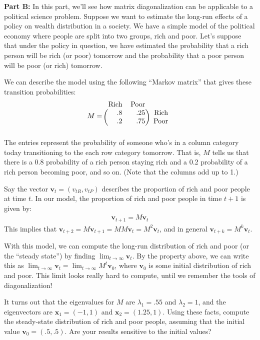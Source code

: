 \documentclass[10pt]{amsart}
\begin{document}
\textbf{Part B:} In this part, we'll see how matrix diagonalization can be applicable to a political science problem. Suppose we want to estimate the long-run effects of a policy on wealth distribution in a society. We have a simple model of the political economy where people are split into two groups, rich and poor. Let's suppose that under the policy in question, we have estimated the probability that a rich person will be rich (or poor) tomorrow and the probability that a poor person will be poor (or rich) tomorrow. 

We can describe the model using the following ``Markov matrix'' that gives these transition probabilities: 
$$
M = \begin{blockarray}{ccc}
\text{Rich} & \text{Poor} \\
\begin{block}{(rr)r}
.8 & .25 & \text{Rich} \\
.2 & .75 & \text{Poor} \\
\end{block}
\end{blockarray}
$$
The entries represent the probability of someone who's in a column category today transitioning to the each row  category tomorrow. That is, $M$ tells us that there is a 0.8 probability of a rich person staying rich and a 0.2 probability of a rich person becoming poor, and so on. (Note that the columns add up to 1.)

Say the vector $\mathbf{v}_t = (v_{tR}, v_{tP})$ describes the proportion of rich and poor people at time $t$. In our model, the proportion of rich and poor people in time $t+1$ is given by:
\begin{align*}
\mathbf{v}_{t+1} = M \mathbf{v}_t
\end{align*}
This implies that $\mathbf{v}_{t+2} = M \mathbf{v}_{t+1} = M M \mathbf{v}_t = M^2 \mathbf{v}_t$, and in general $\mathbf{v}_{t+k} = M^{k} \mathbf{v}_t$.

With this model, we can compute the long-run distribution of rich and poor (or the ``steady state'') by finding $\lim_{t \to \infty} \mathbf{v}_t$. By the property above, we can write this as $\lim_{t \to \infty} \mathbf{v}_t = \lim_{t \to \infty} M^t \mathbf{v}_0$, where $\mathbf{v}_0$ is some initial distribution of rich and poor. This limit looks really hard to compute, until we remember the tools of diagonalization! 

It turns out that the eigenvalues for $M$ are $\lambda_1 = .55$ and $\lambda_2 = 1$, and the eigenvectors are $\mathbf{x}_1 = (-1, 1)$ and $\mathbf{x}_2 = (1.25, 1)$. Using these facts, compute the steady-state distribution of rich and poor people, assuming that the initial value $\mathbf{v}_0 = (.5, .5)$.  Are your results sensitive to the initial values?
\end{document}
